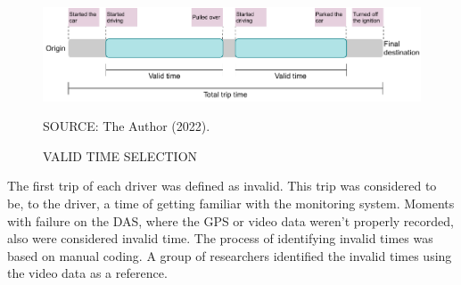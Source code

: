\begin{figure}[!htbp]
    \centering\footnotesize
    \captionsetup{font=footnotesize}
    \caption{VALID TIME SELECTION}
    \includegraphics{fig/validtime.pdf}
    \label{fig:validtime}
    \par SOURCE: The Author (2022).
\end{figure}

The first trip of each driver was defined as invalid. This trip was considered to be, to the driver, a time of getting familiar with the monitoring system. Moments with failure on the DAS, where the GPS or video data weren't properly recorded, also were considered invalid time. The process of identifying invalid times was based on manual coding. A group of researchers identified the invalid times using the video data as a reference. 



